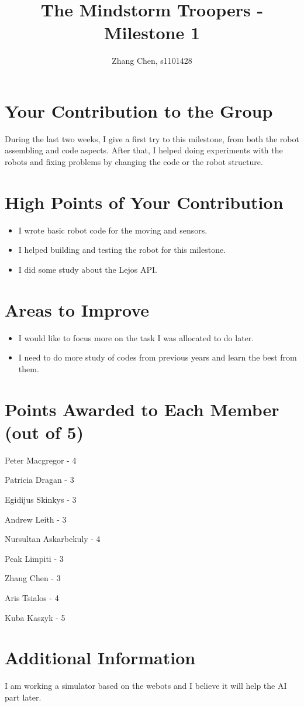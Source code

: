 \documentclass[dvips]{article}
\begin{document}
\sloppy
\title{The Mindstorm Troopers - Milestone 1}
 
\author{Zhang Chen, s1101428}
 
\maketitle

\section{Your Contribution to the Group}
During the last two weeks, I give a first try to this milestone, from both the robot assembling and code aspects. After that, I helped doing experiments with the robots and fixing problems by changing the code or the robot structure.

\section{High Points of Your Contribution}
\begin{itemize}
  \item I wrote basic robot code for the moving and sensors.
  \item I helped building and testing the robot for this milestone.
  \item I did some study about the Lejos API.
  
\end{itemize} 

\section{Areas to Improve}
\begin{itemize}
  \item I would like to focus more on the task I was allocated to do later.
  \item I need to do more study of codes from previous years and learn the best from them.
\end{itemize}


\section{Points Awarded to Each Member (out of 5)}
\begin{itemize}
\begin{multicols}{2}
\item Peter Macgregor - 4
\item Patricia Dragan - 3
\item Egidijus Skinkys - 3
\item Andrew Leith - 3
\item Nursultan Askarbekuly - 4
\item Peak Limpiti - 3
\item Zhang Chen - 3
\item Aris Tsialos - 4
\item Kuba Kaszyk - 5
\end{multicols}
\end{itemize}

\section{Additional Information}
I am working a simulator based on the webots and I believe it will help the AI part later.
\end{document}
